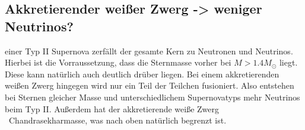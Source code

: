     \subsection{Akkretierender weißer Zwerg -> weniger Neutrinos?}

    \justifying einer Typ II Supernova zerfällt der gesamte Kern zu Neutronen und Neutrinos. Hierbei ist die Vorraussetzung, dass
    die Sternmasse vorher bei $M>1.4M_{\odot}$ liegt. Diese kann natürlich auch deutlich drüber liegen. Bei einem akkretierenden weißen Zwerg hingegen
    wird nur ein Teil der Teilchen fusioniert. Also entstehen bei Sternen gleicher Masse und unterschiedlichem Supernovatyps mehr Neutrinos 
    beim Typ II. Außerdem hat der akkretierende weiße Zwerg ~Chandrasekharmasse, was nach oben natürlich begrenzt ist. 



